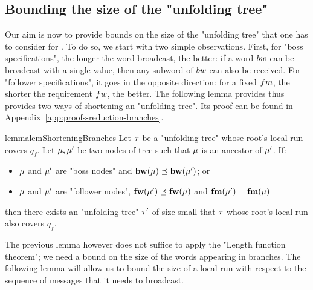 \subsection{Bounding the size of the "unfolding tree"}
\label{sec:tree-bounds}

Our aim is now to provide bounds on the size of the "unfolding tree" that one has to consider for \COVER. To do so, we start with two simple observations. First, for "boss specifications", the longer the word broadcast, the better: if a word $\bossspec$ can be broadcast with a single value, then any subword of $\bossspec$ can also be received. 
For "follower specifications", it goes in the opposite direction: for a fixed $\followmessagespec$, the shorter the requirement $\followwordspec$, the better. The following lemma provides thus provides two ways of shortening an "unfolding tree". Its proof can be found in Appendix~\ref{app:proofs-reduction-branches}.

\begin{restatable}{lemma}{lemShorteningBranches} 
\label{lem:shortening-branches}
	Let $\tau$ be a "unfolding tree" whose root's local run covers $q_f$.
	Let $\mu, \mu'$ be two nodes of tree such that $\mu$ is an ancestor of $\mu'$. If:
	\begin{itemize}
	\item $\mu$ and $\mu'$ are "boss nodes" and $\mathbf{bw}(\mu) \preceq \mathbf{bw}(\mu')$; or
	\item $\mu$ and $\mu'$ are "follower nodes", $\mathbf{fw}(\mu') \preceq \mathbf{fw}(\mu)$ and $\mathbf{fm}(\mu')=\mathbf{fm}(\mu)$
	\end{itemize}

	then there exists an "unfolding tree" $\tau'$ of size small that $\tau$ whose root's local run also covers $q_f$. 
\end{restatable}


The previous lemma however does not suffice to apply the "Length function theorem"; we need a bound on the size of the words appearing in branches. The following lemma will allow us to bound the size of a local run with respect to the sequence of messages that it needs to broadcast. 


